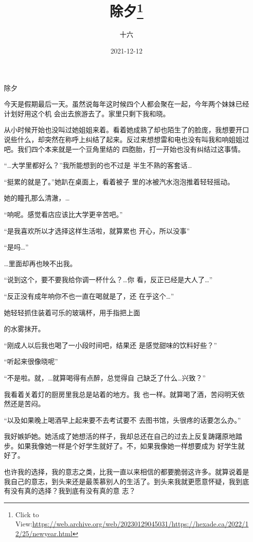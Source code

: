 \documentclass{article}
\title{除夕\footnote{Click to View:\url{https://web.archive.org/web/20230129045031/https://hexade.ca/2022/12/25/newyear.html}}}
\author{十六}
\date{2021-12-12}
\begin{document}

\maketitle


\Large


﻿除夕 

今天是假期最后一天。虽然说每年这时候四个人都会聚在一起，今年两个妹妹已经计划好用这个机
会出去旅游去了。家里只剩下我和晓。 

从小时候开始也没叫过她姐姐来着。看着她成熟了却也陌生了的脸庞，我想要开口说些什么，却突然在称呼上纠结了起来。反过来想想雷和电也没有叫我和响姐姐过吧。我们四个本来就是一个豆角里结的
四胞胎，打一开始也没有纠结过这事情。 

“…大学里都好么？”我所能想到的也不过是
半生不熟的客套话… 

\newpage

“挺累的就是了。”她趴在桌面上，看着被子
里的冰被汽水泡泡推着轻轻摇动。 


她的瞳孔那么清澈，… 


“响呢。感觉看店应该比大学更辛苦吧。” 

“是我喜欢所以才选择这样生活啦，就算累也
开心，所以没事” 


“是吗…” 


…里面却再也映不出我。 

“说到这个，要不要我给你调一杯什么？…你
看，反正已经是大人了…” 

“反正没有成年响你不也一直在喝就是了，还
在乎这个…” 

她轻轻抓住装着可乐的玻璃杯，用手指把上面
\newpage

的水雾抹开。 

“刚成人以后我也喝了一小段时间吧，结果还
是感觉甜味的饮料好些？” 


“听起来很像晓呢” 

“不是啦。就，…就算喝得有点醉，总觉得自
己缺乏了什么…兴致？” 

我看着关着灯的厨房里我总是站着的地方。我
也一样。就算喝了酒，苦闷明天依然还是苦闷。 

“以及如果晚上喝酒早上起来要不去考试要不
去图书馆，头很疼的话要怎么办。” 

我好嫉妒她。她活成了她想活的样子，我却总还在自己的过去上反复踌躇原地踏步。如果我像她一样是个好学生就好了。不，如果我像她一样想要成为
好学生就好了。 

\newpage

也许我的选择，我的意志之类，比我一直以来相信的都要脆弱这许多。就算说着是我自己的意志，到头来还是最羡慕别人的生活了。到头来我就更愿意怀疑，我到底有没有真的选择？我到底有没有真的意
志？ 
\end{document}
